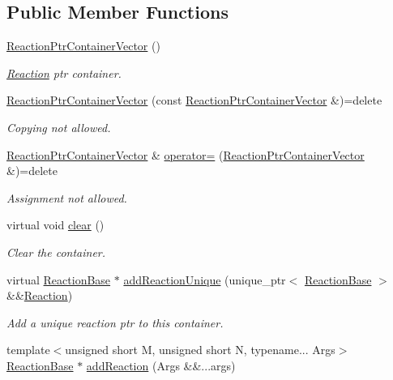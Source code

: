 \subsection*{Public Member Functions}
\begin{DoxyCompactItemize}
\item 
\hyperlink{classReactionPtrContainerVector_a323c7c77e3485b96ae7e74f7abcd5574}{Reaction\+Ptr\+Container\+Vector} ()
\begin{DoxyCompactList}\small\item\em \hyperlink{classReaction}{Reaction} ptr container. \end{DoxyCompactList}\item 
\hyperlink{classReactionPtrContainerVector_ab3281d4f97e012075666064b162ace2f}{Reaction\+Ptr\+Container\+Vector} (const \hyperlink{classReactionPtrContainerVector}{Reaction\+Ptr\+Container\+Vector} \&)=delete
\begin{DoxyCompactList}\small\item\em Copying not allowed. \end{DoxyCompactList}\item 
\hyperlink{classReactionPtrContainerVector}{Reaction\+Ptr\+Container\+Vector} \& \hyperlink{classReactionPtrContainerVector_ad6204564f34d05a4ea51945a5c7f5cd0}{operator=} (\hyperlink{classReactionPtrContainerVector}{Reaction\+Ptr\+Container\+Vector} \&)=delete
\begin{DoxyCompactList}\small\item\em Assignment not allowed. \end{DoxyCompactList}\item 
virtual void \hyperlink{classReactionPtrContainerVector_a6b587a2b526efd88dfa91d1125950800}{clear} ()
\begin{DoxyCompactList}\small\item\em Clear the container. \end{DoxyCompactList}\item 
virtual \hyperlink{classReactionBase}{Reaction\+Base} $\ast$ \hyperlink{classReactionPtrContainerVector_a0b3cd521c3a59239f2a65c34c8de4988}{add\+Reaction\+Unique} (unique\+\_\+ptr$<$ \hyperlink{classReactionBase}{Reaction\+Base} $>$ \&\&\hyperlink{classReaction}{Reaction})
\begin{DoxyCompactList}\small\item\em Add a unique reaction ptr to this container. \end{DoxyCompactList}\item 
{\footnotesize template$<$unsigned short M, unsigned short N, typename... Args$>$ }\\\hyperlink{classReactionBase}{Reaction\+Base} $\ast$ \hyperlink{classReactionPtrContainerVector_a30fada2b38ba35fe54c08d3bbf21cada}{add\+Reaction} (Args \&\&...args)

\end{DoxyCompactItemize}
